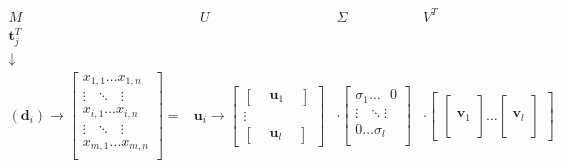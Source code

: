 $$
\begin{matrix} 
 M &  ~~ U & \Sigma & V^T \\
 \textbf{t}_j^T &  & &  \\
 \downarrow &  & &  \\
(\textbf{d}_i) \rightarrow 
\begin{bmatrix}
x_{1,1} \dots  x_{1,n} \\
\vdots ~~~  \ddots ~~~ \vdots \\
x_{i,1} \dots  x_{i,n} \\
\vdots ~~~ \ddots ~~~ \vdots \\
x_{m,1} \dots  x_{m,n} \\
\end{bmatrix}
=
&
\textbf{u}_i \rightarrow
\begin{bmatrix} 
\begin{bmatrix} & \textbf{u}_1 & \end{bmatrix} \\
\vdots \\
\begin{bmatrix} & \textbf{u}_l & \end{bmatrix}
\end{bmatrix}
&
\cdot
\begin{bmatrix} 
\sigma_1 \dots ~~~ 0 \\
\vdots ~~~ \ddots  \vdots \\
0  \dots  \sigma_l \\
\end{bmatrix}
&
\cdot
\begin{bmatrix} 
\begin{bmatrix} \, \\ \, \\ \textbf{v}_1 \\ \, \\ \,\end{bmatrix} 
\dots
\begin{bmatrix} \, \\ \, \\ \textbf{v}_l \\ \, \\ \, \end{bmatrix}
\end{bmatrix}
\end{matrix}
$$